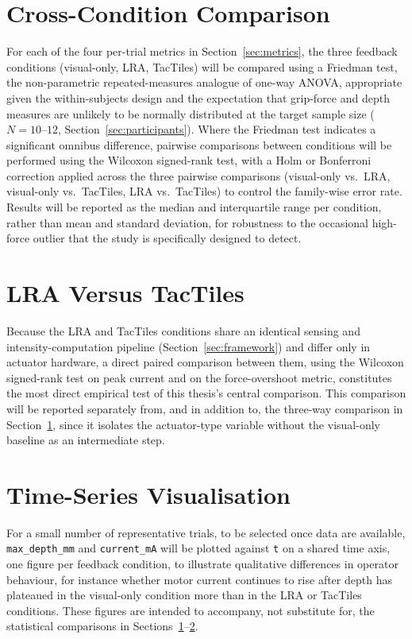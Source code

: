 \documentclass[12pt, a4paper]{report}
\begin{document}
\section{Cross-Condition Comparison}
\label{sec:crosscond}
For each of the four per-trial metrics in Section~\ref{sec:metrics}, the three feedback conditions (visual-only, LRA, TacTiles) will be compared using a Friedman test, the non-parametric repeated-measures analogue of one-way ANOVA, appropriate given the within-subjects design and the expectation that grip-force and depth measures are unlikely to be normally distributed at the target sample size ($N=10$--$12$, Section~\ref{sec:participants}). Where the Friedman test indicates a significant omnibus difference, pairwise comparisons between conditions will be performed using the Wilcoxon signed-rank test, with a Holm or Bonferroni correction applied across the three pairwise comparisons (visual-only vs.\ LRA, visual-only vs.\ TacTiles, LRA vs.\ TacTiles) to control the family-wise error rate. Results will be reported as the median and interquartile range per condition, rather than mean and standard deviation, for robustness to the occasional high-force outlier that the study is specifically designed to detect.

\section{LRA Versus TacTiles}
\label{sec:lravstac}
Because the LRA and TacTiles conditions share an identical sensing and intensity-computation pipeline (Section~\ref{sec:framework}) and differ only in actuator hardware, a direct paired comparison between them, using the Wilcoxon signed-rank test on peak current and on the force-overshoot metric, constitutes the most direct empirical test of this thesis's central comparison. This comparison will be reported separately from, and in addition to, the three-way comparison in Section~\ref{sec:crosscond}, since it isolates the actuator-type variable without the visual-only baseline as an intermediate step.

\section{Time-Series Visualisation}
For a small number of representative trials, to be selected once data are available, \texttt{max\_depth\_mm} and \texttt{current\_mA} will be plotted against \texttt{t} on a shared time axis, one figure per feedback condition, to illustrate qualitative differences in operator behaviour, for instance whether motor current continues to rise after depth has plateaued in the visual-only condition more than in the LRA or TacTiles conditions. These figures are intended to accompany, not substitute for, the statistical comparisons in Sections~\ref{sec:crosscond}--\ref{sec:lravstac}.
\end{document}
